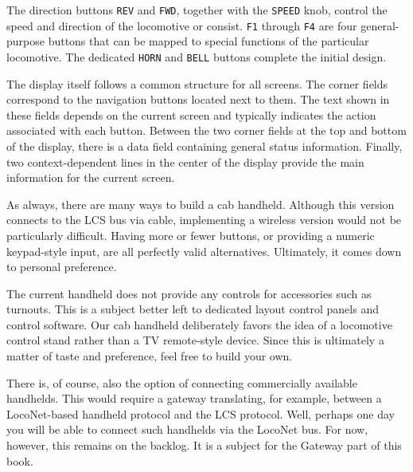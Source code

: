 The direction buttons \texttt{REV} and \texttt{FWD}, together with the \texttt{SPEED} knob, control the speed and direction of the locomotive or consist. \texttt{F1} through \texttt{F4} are four general-purpose buttons that can be mapped to special functions of the particular locomotive. The dedicated \texttt{HORN} and \texttt{BELL} buttons complete the initial design.

The display itself follows a common structure for all screens. The corner fields correspond to the navigation buttons located next to them. The text shown in these fields depends on the current screen and typically indicates the action associated with each button.
Between the two corner fields at the top and bottom of the display, there is a data field containing general status information. Finally, two context-dependent lines in the center of the display provide the main information for the current screen.

As always, there are many ways to build a cab handheld. Although this version connects to the LCS bus via cable, implementing a wireless version would not be particularly difficult. Having more or fewer buttons, or providing a numeric keypad-style input, are all perfectly valid alternatives. Ultimately, it comes down to personal preference.

The current handheld does not provide any controls for accessories such as turnouts. This is a subject better left to dedicated layout control panels and control software. Our cab handheld deliberately favors the idea of a locomotive control stand rather than a TV remote-style device. Since this is ultimately a matter of taste and preference, feel free to build your own.

There is, of course, also the option of connecting commercially available handhelds. This would require a gateway translating, for example, between a LocoNet-based handheld protocol and the LCS protocol.
Well, perhaps one day you will be able to connect such handhelds via the LocoNet bus. For now, however, this remains on the backlog. It is a subject for the Gateway part of this book.